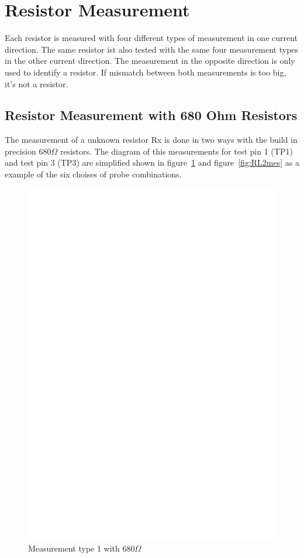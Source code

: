 \section{Resistor Measurement}
Each resistor is measured with four different types of measurement in one current direction.
The same resistor ist also tested with the same four measurement types in the other current direction.
The measurement in the opposite direction is only used to identify a resistor.
If mismatch between both measurements is too big, it's not a resistor.

\subsection{Resistor Measurement with 680 Ohm Resistors}
The measurement of a unknown resistor Rx is done in two ways with the build in precision
 \(680\Omega\) resistors. The diagram of this measurements for test pin 1 (TP1) and test pin 3 (TP3) are
 simplified shown in figure~\ref{fig:RL1mes} and figure~\ref{fig:RL2mes} as a example of the six choises of probe combinations.

\begin{figure}[H]
\centering
\includegraphics[]{../FIG/ResistormessL1.eps}
\caption{Measurement type 1 with \(680\Omega\) }
\label{fig:RL1mes}
\end{figure}

